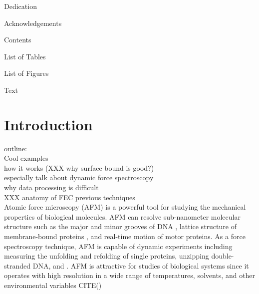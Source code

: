 \documentclass[%
  aip,12pt,tightenlines,
  amsthm,
 amsmath,amssymb
]{article}
\newcommand{\sLabel}[1]{\label{section:#1}}
\newcommand{\firstp}[0]{}
\newcommand{\pl}[0]{\vspace{6pt}}
\newcommand{\citePRH}[1]{\cite{#1}}
\begin{document}
\clearpage

Dedication

\clearpage

Acknowledgements

\clearpage

Contents

\clearpage

List of Tables 

\clearpage

List of Figures 

\clearpage

Text


\maketitle

\doublespacing

\section{\sLabel{Intro}Introduction}

outline:\\
Cool examples \\
how it works  (XXX why surface bound is good?)\\
especially talk about dynamic force spectroscopy \\
why data processing is difficult \\
XXX anatomy of FEC
previous techniques\\

\firstp Atomic force microscopy (AFM) is a powerful tool for studying the mechanical properties of biological molecules.  AFM can resolve sub-nanometer molecular structure such as the major and minor grooves of DNA \citePRH{ido_beyond_2013}, lattice structure of membrane-bound proteins \citePRH{muller_surface_1999}, and real-time motion of motor proteins\citePRH{ando_high-speed_2007}. As a force spectroscopy technique, AFM is capable of dynamic experiments including measuring the unfolding and refolding of single proteins\citePRH{he_direct_2015}, unzipping double-stranded DNA\citePRH{krautbauer_Unzipping_2003}, and . AFM is attractive for studies of biological systems since it operates with high resolution in a wide range of temperatures, solvents, and other environmental variables CITE() \pl
\end{document}
